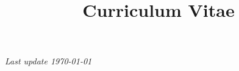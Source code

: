\documentclass[12pt, letterpaper, unicode]{moderncv}
\title{Curriculum Vitae}
\begin{document}
    \makecvtitle

    
    
    
    
    
    
    
    
    
    
    
    
    \ifdefined\publicversion
        
    \else
        
    \fi

    
    \emptysection{}\closesection
    \vfill
    \begin{center}
        \textit{\footnotesize Last update \today}
    \end{center}
\end{document}
